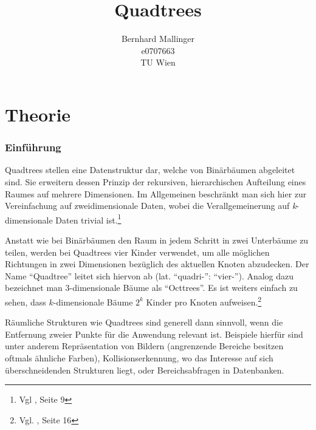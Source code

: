 \documentclass[%
			paper=a4,%
			DIV12,
			liststotoc,
			bibtotoc,
			draft=false,%
			titlepage
			]{scrartcl}
\title{Quadtrees}
\author{Bernhard Mallinger \\ e0707663 \\ TU Wien}
\newcommand{\zit}[3]{#1 \cite{#2}, #3}
\newcommand{\footzit}[3]{\footnote{\zit{#1}{#2}{#3}}}
\begin{document}
\maketitle

\tableofcontents 

\newpage

%
%
%
%
%
%
%
%
%


\part{Theorie}
\section{Einführung}
Quadtrees stellen eine Datenstruktur dar, welche von Binärbäumen abgeleitet sind. Sie erweitern dessen Prinzip der rekursiven, hierarchischen Aufteilung eines Raumes auf mehrere Dimensionen. 
Im Allgemeinen beschränkt man sich hier zur Vereinfachung auf zweidimensionale Daten, wobei die Verallgemeinerung auf \textit{k}-dimensionale Daten trivial ist.\footzit{Vgl}{DBLP:journals/acta/FinkelB74}{Seite 9}

Anstatt wie bei Binärbäumen den Raum in jedem Schritt in zwei Unterbäume zu teilen, werden bei Quadtrees vier Kinder verwendet, um alle möglichen Richtungen in zwei Dimensionen bezüglich des aktuellen Knoten abzudecken. Der Name "`Quadtree"' leitet sich hiervon ab (lat. "`quadri-"': "`vier-"'). 
Analog dazu bezeichnet man 3-dimensionale Bäume als "`Octtrees"'. Es ist weiters einfach zu sehen, dass $k$-dimensionale Bäume $2^k$ Kinder pro Knoten aufweisen.\footzit{Vgl.}{Bentley:1979}{Seite 16}

Räumliche Strukturen wie Quadtrees sind generell dann sinnvoll, wenn die Entfernung zweier Punkte für die Anwendung relevant ist.
Beispiele hierfür sind unter anderem Repräsentation von Bildern (angrenzende Bereiche besitzen oftmals ähnliche Farben), Kollisionserkennung, wo das Interesse auf sich überschneidenden Strukturen liegt, oder Bereichsabfragen in Datenbanken.
\end{document}
